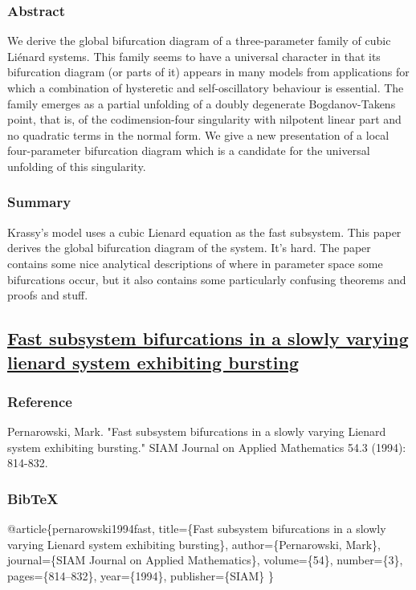 \documentclass[11pt]{article}
\begin{document}
\subsubsection{Abstract}
\label{sec:orgdf8362f}
We derive the global bifurcation diagram of a three-parameter family
of cubic Liénard systems. This family seems to have a universal
character in that its bifurcation diagram (or parts of it) appears in
many models from applications for which a combination of hysteretic
and self-oscillatory behaviour is essential. The family emerges as a
partial unfolding of a doubly degenerate Bogdanov-Takens point, that
is, of the codimension-four singularity with nilpotent linear part and
no quadratic terms in the normal form. We give a new presentation of a
local four-parameter bifurcation diagram which is a candidate for the
universal unfolding of this singularity.

\subsubsection{Summary}
\label{sec:org7758f7a}
Krassy's model uses a cubic Lienard equation as the fast subsystem. 
This paper derives the global bifurcation diagram of the system.
It's hard.
The paper contains some nice analytical descriptions of where in parameter space some bifurcations occur, but it also contains some particularly confusing theorems and proofs and stuff.

\subsection{\href{https://scholar.google.com/scholar?hl=en\&as\_sdt=0\%2C5\&q=fast+subsystem+bifurcations+in+a+slowly+varying+lienard+sysetem+exhibiting+bursting\&btnG=}{Fast subsystem bifurcations in a slowly varying lienard system exhibiting bursting}}
\label{sec:org3e08832}
\subsubsection{Reference}
\label{sec:org4f95d66}
Pernarowski, Mark. "Fast subsystem bifurcations in a slowly varying Lienard system exhibiting bursting." SIAM Journal on Applied Mathematics 54.3 (1994): 814-832.

\subsubsection{BibTeX}
\label{sec:orgc40250c}
@article\{pernarowski1994fast,
  title=\{Fast subsystem bifurcations in a slowly varying Lienard system exhibiting bursting\},
  author=\{Pernarowski, Mark\},
  journal=\{SIAM Journal on Applied Mathematics\},
  volume=\{54\},
  number=\{3\},
  pages=\{814--832\},
  year=\{1994\},
  publisher=\{SIAM\}
\}
\end{document}
